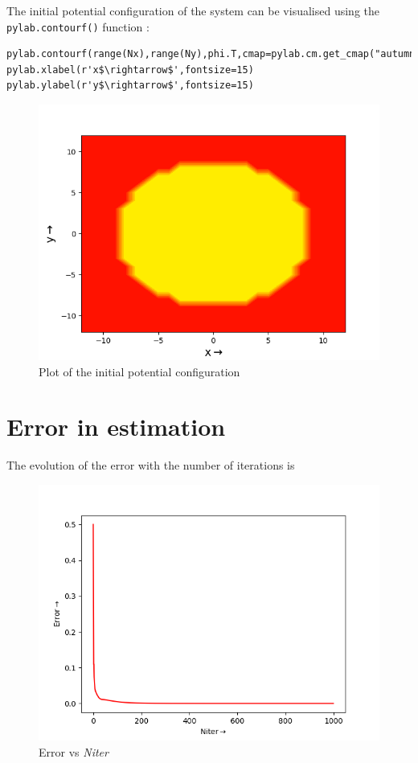 \documentclass[11pt, a4paper]{article}
\begin{document}
The initial potential configuration of the system can be visualised using the \texttt{pylab.contourf()} function :

\begin{verbatim}
pylab.contourf(range(Nx),range(Ny),phi.T,cmap=pylab.cm.get_cmap("autumn"))
pylab.xlabel(r'x$\rightarrow$',fontsize=15)
pylab.ylabel(r'y$\rightarrow$',fontsize=15)
\end{verbatim}

\begin{figure}[!htb]
\centering
\includegraphics[scale=0.5]{potential.png}
\caption{Plot of the initial potential configuration}
\label{fig:1}
\end{figure}

\newpage

\section*{Error in estimation}

The evolution of the error with the number of iterations is 

\begin{figure}[!htb]
\centering
\includegraphics[scale=0.5]{Error.png}
\caption{Error vs \textit{Niter}}
\label{fig:3}
\end{figure}
\end{document}
